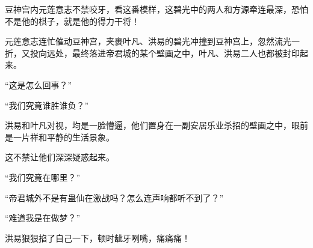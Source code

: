 \begin{this_body}
豆神宫内元莲意志不禁咬牙，看这番模样，这碧光中的两人和方源牵连最深，恐怕不是他的棋子，就是他的得力干将！

元莲意志连忙催动豆神宫，夹裹叶凡、洪易的碧光冲撞到豆神宫上，忽然流光一折，又投向远处，最终落进帝君城的某个壁画之中，叶凡、洪易二人也都被封印起来。

“这是怎么回事？”

“我们究竟谁胜谁负？”

洪易和叶凡对视，均是一脸懵逼，他们置身在一副安居乐业杀招的壁画之中，眼前是一片祥和平静的生活景象。

这不禁让他们深深疑惑起来。

“我们究竟在哪里？”

“帝君城外不是有蛊仙在激战吗？怎么连声响都听不到了？”

“难道我是在做梦？”

洪易狠狠掐了自己一下，顿时龇牙咧嘴，痛痛痛！

\end{this_body}

